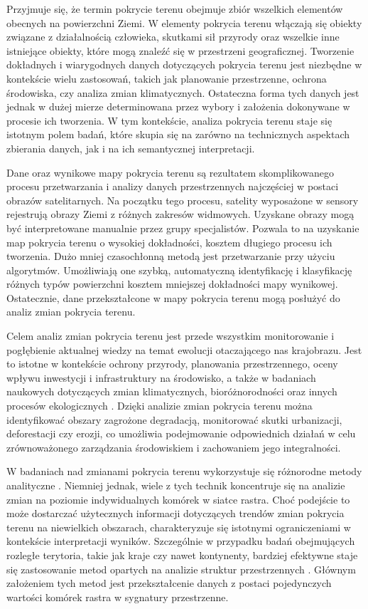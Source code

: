 \documentclass{amuthesis}
\begin{document}
Przyjmuje się, że termin pokrycie terenu obejmuje zbiór wszelkich
elementów obecnych na powierzchni Ziemi. W elementy pokrycia terenu
włączają się obiekty związane z działalnością człowieka, skutkami sił
przyrody oraz wszelkie inne istniejące obiekty, które mogą znaleźć się w
przestrzeni geograficznej. Tworzenie dokładnych i wiarygodnych danych
dotyczących pokrycia terenu jest niezbędne w kontekście wielu
zastosowań, takich jak planowanie przestrzenne, ochrona środowiska, czy
analiza zmian klimatycznych. Ostateczna forma tych danych jest jednak w
dużej mierze determinowana przez wybory i założenia dokonywane w
procesie ich tworzenia. W tym kontekście, analiza pokrycia terenu staje
się istotnym polem badań, które skupia się na zarówno na technicznych
aspektach zbierania danych, jak i na ich semantycznej interpretacji.

Dane oraz wynikowe mapy pokrycia terenu są rezultatem skomplikowanego
procesu przetwarzania i analizy danych przestrzennych najczęściej w
postaci obrazów satelitarnych. Na początku tego procesu, satelity
wyposażone w sensory rejestrują obrazy Ziemi z różnych zakresów
widmowych. Uzyskane obrazy mogą być interpretowane manualnie przez grupy
specjalistów. Pozwala to na uzyskanie map pokrycia terenu o wysokiej
dokładności, kosztem długiego procesu ich tworzenia. Dużo mniej
czasochłonną metodą jest przetwarzanie przy użyciu algorytmów.
Umożliwiają one szybką, automatyczną identyfikację i klasyfikację
różnych typów powierzchni kosztem mniejszej dokładności mapy wynikowej.
Ostatecznie, dane przekształcone w mapy pokrycia terenu mogą posłużyć do
analiz zmian pokrycia terenu.

Celem analiz zmian pokrycia terenu jest przede wszystkim monitorowanie i
pogłębienie aktualnej wiedzy na temat ewolucji otaczającego nas
krajobrazu. Jest to istotne w kontekście ochrony przyrody, planowania
przestrzennego, oceny wpływu inwestycji i infrastruktury na środowisko,
a także w badaniach naukowych dotyczących zmian klimatycznych,
bioróżnorodności oraz innych procesów ekologicznych
\autocite{ChangeDetectionTechniques}. Dzięki analizie zmian pokrycia
terenu można identyfikować obszary zagrożone degradacją, monitorować
skutki urbanizacji, deforestacji czy erozji, co umożliwia podejmowanie
odpowiednich działań w celu zrównoważonego zarządzania środowiskiem i
zachowaniem jego integralności.

W badaniach nad zmianami pokrycia terenu wykorzystuje się różnorodne
metody analityczne \autocite{ChangeDetectionTechniques}. Niemniej
jednak, wiele z tych technik koncentruje się na analizie zmian na
poziomie indywidualnych komórek w siatce rastra. Choć podejście to może
dostarczać użytecznych informacji dotyczących trendów zmian pokrycia
terenu na niewielkich obszarach, charakteryzuje się istotnymi
ograniczeniami w kontekście interpretacji wyników. Szczególnie w
przypadku badań obejmujących rozległe terytoria, takie jak kraje czy
nawet kontynenty, bardziej efektywne staje się zastosowanie metod
opartych na analizie struktur przestrzennych \textcite{Netzel2015}.
Głównym założeniem tych metod jest przekształcenie danych z postaci
pojedynczych wartości komórek rastra w sygnatury przestrzenne.
\end{document}

